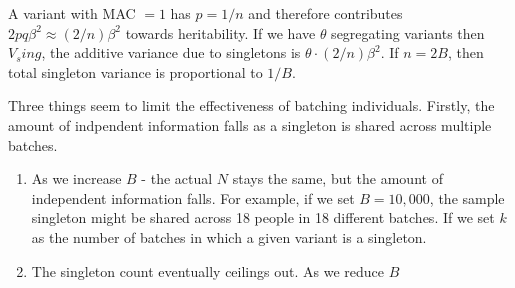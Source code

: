 \documentclass{article}
\begin{document}
A variant with MAC $=1$ has $p=1/n$ and therefore contributes $2pq\beta^2 \approx (2/n)\beta^2$ towards heritability. If we have $\theta$ segregating variants then $V_sing$, the additive variance due to singletons is $\theta \cdot (2/n)\beta^2$. If $n=2B$, then total singleton variance is proportional to $1/B$.

Three things seem to limit the effectiveness of batching individuals. Firstly, the amount of indpendent information falls as a singleton is shared across multiple batches.

\begin{enumerate}
    \item As we increase $B$ - the actual $N$ stays the same, but the amount of independent information falls. For example, if we set $B=10{,}000$, the sample singleton might be shared across 18 people in 18 different batches. If we set $k$ as the number of batches in which a given variant is a singleton.
    \item The singleton count eventually ceilings out. As we reduce $B$
\end{enumerate}
\end{document}
